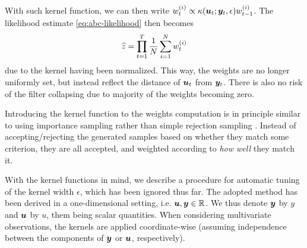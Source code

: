 With such kernel function, we can then write $w_t^{(i)} \propto \kappa(\bm{u}_t; \bm{y}_t, \epsilon) w_{t-1}^{(i)}$. The likelihood estimate \eqref{eq:abc-likelihood} then becomes
\begin{equation} \label{eq:abc-likelihood-kernel}
\widehat{z} = \prod_{t=1}^T \frac{1}{N} \sum_{i=1}^N w_t^{(i)}
\end{equation}
due to the kernel having been normalized. This way, the weights are no longer uniformly set, but instead reflect the distance of $\bm{u}_t$ from $\bm{y}_t$. There is also no risk of the filter collapsing due to majority of the weights becoming zero.

Introducing the kernel function to the weights computation is in principle similar to using importance sampling rather than simple rejection sampling \citep{information-theory}. Instead of accepting/rejecting the generated samples based on whether they match some criterion, they are all accepted, and weighted according to \emph{how well} they match it.

With the kernel functions in mind, we describe a procedure for automatic tuning of the kernel width $\epsilon$, which has been ignored thus far. The adopted method has been derived in a one-dimensional setting, i.e. $\bm{u}, \bm{y} \in \mathbb{R}$. We thus denote $\bm{y}$ by $y$ and $\bm{u}$ by $u$, them being scalar quantities. When considering multivariate observations, the kernels are applied coordinate-wise (assuming independence between the components of $\bm{y}$ or $\bm{u}$, respectively).

